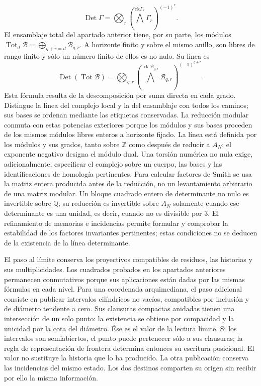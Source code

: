 \[
\operatorname{Det}\Gamma=
\bigotimes_r\left(\bigwedge^{\mathrm{rk}\Gamma_r}\Gamma_r\right)^{(-1)^r}.
\]
El ensamblaje total del apartado anterior tiene, por su parte, los módulos \(\operatorname{Tot}_d\mathcal B=\bigoplus_{q+r=d}\mathcal B_{q,r}\). A horizonte finito y sobre el mismo anillo, son libres de rango finito y sólo un número finito de ellos es no nulo. Su línea es
\[
\operatorname{Det}(\operatorname{Tot}\mathcal B)=
\bigotimes_{q,r}
\left(\bigwedge^{\operatorname{rk}\mathcal B_{q,r}}
\mathcal B_{q,r}\right)^{(-1)^{q+r}}.
\]
Esta fórmula resulta de la descomposición por suma directa en cada grado. Distingue la línea del complejo local y la del ensamblaje con todos los caminos; sus bases se ordenan mediante las etiquetas conservadas. La reducción modular conmuta con estas potencias exteriores porque los módulos y sus bases proceden de los mismos módulos libres enteros a horizonte fijado.
La línea está definida por los módulos y sus grados, tanto sobre \(\mathbb Z\) como después de reducir a \(A_N\); el exponente negativo designa el módulo dual. Una torsión numérica no nula exige, adicionalmente, especificar el complejo sobre un cuerpo, las bases y las identificaciones de homología pertinentes. Para calcular factores de Smith se usa la matriz entera producida antes de la reducción, no un levantamiento arbitrario de una matriz modular. Un bloque cuadrado entero de determinante no nulo es invertible sobre \(\mathbb Q\); su reducción es invertible sobre \(A_N\) solamente cuando ese determinante es una unidad, es decir, cuando no es divisible por \(3\). El refinamiento de memorias e incidencias permite formular y comprobar la estabilidad de los factores invariantes pertinentes; estas condiciones no se deducen de la existencia de la línea determinante.

El paso al límite conserva los proyectivos compatibles de residuos, las historias y sus multiplicidades. Los cuadrados probados en los apartados anteriores permanecen conmutativos porque sus aplicaciones están dadas por las mismas fórmulas en cada nivel. Para una coordenada arquimediana, el paso adicional consiste en publicar intervalos cilíndricos no vacíos, compatibles por inclusión y de diámetro tendente a cero. Sus clausuras compactas anidadas tienen una intersección de un solo punto: la existencia se obtiene por compacidad y la unicidad por la cota del diámetro. Ése es el valor de la lectura límite. Si los intervalos son semiabiertos, el punto puede pertenecer sólo a sus clausuras; la regla de representación de frontera determina entonces su escritura posicional. El valor no sustituye la historia que lo ha producido. La otra publicación conserva las incidencias del mismo estado. Los dos destinos comparten su origen sin recibir por ello la misma información.

